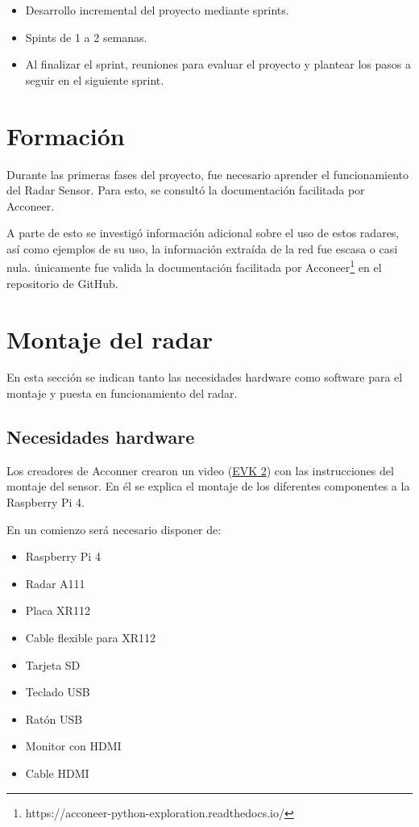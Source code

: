 \begin{itemize}
\item Desarrollo incremental del proyecto mediante sprints. 
\item Spints de 1 a 2 semanas. 
\item Al finalizar el sprint, reuniones para evaluar el proyecto y plantear los pasos a seguir en el siguiente sprint.
\end{itemize}

\section{Formación}
Durante las primeras fases del proyecto, fue necesario aprender el funcionamiento del Radar Sensor. Para esto, se consultó la documentación facilitada por Acconeer.

A parte de esto se investigó información adicional sobre el uso de estos radares, así como ejemplos de su uso, la información extraída de la red fue escasa o casi nula. únicamente fue valida la documentación facilitada por Acconeer\footnote{https://acconeer-python-exploration.readthedocs.io/} en el repositorio de GitHub.

\section{Montaje del radar}

En esta sección se indican tanto las necesidades hardware como software para el montaje y puesta en funcionamiento del radar.

\subsection{Necesidades hardware}
Los creadores de Acconner crearon un video (\href{https://www.youtube.com/watch?v=0uKrm_RAV_c}{EVK 2}) con las instrucciones del montaje del sensor. En él se explica el montaje de los diferentes componentes a la Raspberry Pi 4.

En un comienzo será necesario disponer de: 
\begin{itemize}
\item Raspberry Pi 4
\item Radar A111
\item Placa XR112
\item Cable flexible para XR112
\item Tarjeta SD
\item Teclado USB
\item Ratón USB
\item Monitor con HDMI
\item Cable HDMI
\end{itemize}

